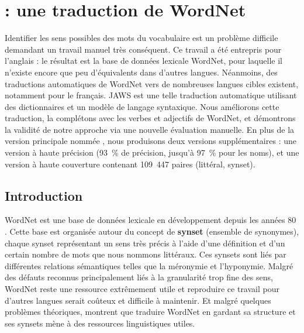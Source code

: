 \chapter{\newjaws{} : une traduction de WordNet}
\label{ch:wonef} 

Identifier les sens possibles des mots du vocabulaire est un problème difficile demandant un travail manuel très conséquent. Ce travail a été entrepris pour l'anglais : le résultat est la base de données lexicale WordNet, pour laquelle il n'existe encore que peu d'équivalents dans d'autres langues. Néanmoins, des traductions automatiques de WordNet vers de nombreuses langues cibles existent, notamment pour le français. JAWS est une telle traduction automatique utilisant des dictionnaires et un modèle de langage syntaxique. Nous améliorons cette traduction, la complétons avec les verbes et adjectifs de WordNet, et démontrons la validité de notre approche via une nouvelle évaluation manuelle. En plus de la version principale nommée \newjaws{}, nous produisons deux versions supplémentaires : une version à haute précision (93~\% de précision, jusqu'à 97~\% pour les noms), et une version à haute couverture contenant 109~447 paires (littéral, synset).


\section{Introduction}
\label{sec:intro}

WordNet est une base de données lexicale en développement depuis les années 80 \citep{fellbaum98wordnet}. Cette base est organisée autour du concept de \textbf{synset} (ensemble de synonymes), chaque synset représentant un sens très précis à l'aide d'une définition et d'un certain nombre de mots que nous nommons littéraux. Ces synsets sont liés par différentes relations sémantiques telles que la méronymie et l'hyponymie. Malgré des défauts reconnus \citep{boyd2006adding} principalement liés à la granularité trop fine des sens, WordNet reste une ressource extrêmement utile et reproduire ce travail pour d'autres langues serait coûteux et difficile à maintenir. Et malgré quelques problèmes théoriques, \cite{fellbaum2007connecting,demelo2008utility} montrent que traduire WordNet en gardant sa structure et ses synsets mène à des ressources linguistiques utiles.

